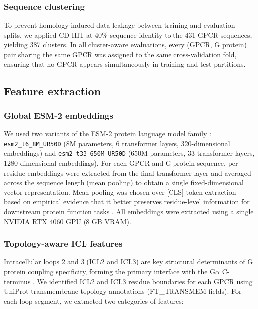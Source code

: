 \documentclass[11pt,a4paper]{article}
\begin{document}
\subsubsection{Sequence clustering}

To prevent homology-induced data leakage between training and evaluation splits, we applied CD-HIT \cite{li2006cdhit} at 40\% sequence identity to the 431 GPCR sequences, yielding 387 clusters. In all cluster-aware evaluations, every (GPCR, G protein) pair sharing the same GPCR was assigned to the same cross-validation fold, ensuring that no GPCR appears simultaneously in training and test partitions.

\subsection{Feature extraction}

\subsubsection{Global ESM-2 embeddings}

We used two variants of the ESM-2 protein language model family \cite{lin2023evolutionary}: \texttt{esm2\_t6\_8M\_UR50D} (8M parameters, 6 transformer layers, 320-dimensional embeddings) and \texttt{esm2\_t33\_650M\_UR50D} (650M parameters, 33 transformer layers, 1280-dimensional embeddings). For each GPCR and G protein sequence, per-residue embeddings were extracted from the final transformer layer and averaged across the sequence length (mean pooling) to obtain a single fixed-dimensional vector representation. Mean pooling was chosen over [CLS] token extraction based on empirical evidence that it better preserves residue-level information for downstream protein function tasks \cite{detlefsen2022evaluation}. All embeddings were extracted using a single NVIDIA RTX 4060 GPU (8 GB VRAM).

\subsubsection{Topology-aware ICL features}

Intracellular loops 2 and 3 (ICL2 and ICL3) are key structural determinants of G protein coupling specificity, forming the primary interface with the G$\alpha$ C-terminus \cite{flock2023selectivity, rasmussen2011crystal}. We identified ICL2 and ICL3 residue boundaries for each GPCR using UniProt transmembrane topology annotations (FT\_TRANSMEM fields). For each loop segment, we extracted two categories of features:
\end{document}
